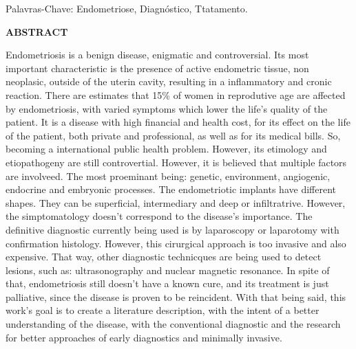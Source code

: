 \documentclass[12pt]{article} %
\begin{document}
Palavras-Chave: Endometriose, Diagnóstico, Ttatamento.


\newpage
\begin{center}
\MakeUppercase{\textbf{Abstract}}
\end{center}

Endometriosis is a benign disease, enigmatic and controversial.  Its
most important characteristic is the presence of active endometric
tissue, non neoplasic, outside of the uterin cavity, resulting in a
inflammatory and cronic reaction.
There are estimates that 15\% of women in reprodutive age are affected
by endometriosis, with varied symptoms which lower the life's quality
of the patient. It is a disease with high financial and health cost,
for its effect on the life of the patient, both private and
professional, as well as for its medical bills. So, becoming a
international public health problem.
However, its etimology and etiopathogeny are still
controvertial. However, it is believed that multiple factors are
involveed. The most proeminant being: genetic, environment,
angiogenic, endocrine and embryonic processes.
The endometriotic implants have different shapes. They can be
superficial, intermediary and deep or infiltratrive. However, the
simptomatology doesn't correspond to the disease's importance.
The definitive diagnostic currently being used is by laparoscopy or
laparotomy with confirmation histology. However, this cirurgical
approach is too invasive and also expensive. That way, other
diagnostic technicques are being used to detect lesions, such as:
ultrasonography and nuclear magnetic resonance.
In spite of that, endometriosis still doesn't have a known cure, and
its treatment is just palliative, since the disease is proven
to be reincident.
With that being said, this work's goal is to create a literature
description, with the intent of a better understanding of the disease,
with the conventional diagnostic and the research for better
approaches of early diagnostics and minimally invasive.

\newpage

\listoffigures
{} \selectfont




\newpage

\tableofcontents
{} \selectfont


\newpage







\end{document}
